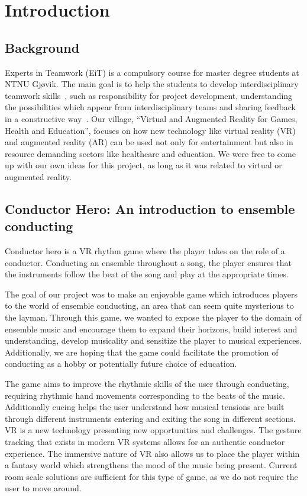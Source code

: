 \chapter{Introduction}

\section{Background}
Experts in Teamwork (EiT) is a compulsory course for master degree students at NTNU Gjøvik. The main goal is to help the students to develop interdisciplinary teamwork skills~\cite{eit}, such as responsibility for project development, understanding the possibilities which appear from interdisciplinary teams and sharing feedback in a constructive way~\cite{eitQA}. Our village, “Virtual and Augmented Reality for Games, Health and Education”, focuses on how new technology like virtual reality (VR) and augmented reality (AR) can be used not only for entertainment but also in resource demanding sectors like healthcare and education. We were free to come up with our own ideas for this project, as long as it was related to virtual or augmented reality.
\section{Conductor Hero: An introduction to ensemble conducting}
Conductor hero is a VR rhythm game where the player takes on the role of a conductor. Conducting an ensemble throughout a song, the player ensures that the instruments follow the beat of the song and play at the appropriate times. 

The goal of our project was to make an enjoyable game which introduces players to the world of ensemble conducting, an area that can seem quite mysterious to the layman. Through this game, we wanted to expose the player to the domain of ensemble music and encourage them to expand their horizons, build interest and understanding, develop musicality and sensitize the player to musical experiences. Additionally, we are hoping that the game could facilitate the promotion of conducting as a hobby or potentially future choice of education.

The game aims to improve the rhythmic skills of the user through conducting, requiring rhythmic hand movements corresponding to the beats of the music. Additionally cueing helps the user understand how musical tensions are built through different instruments entering and exiting the song in different sections.
VR is a new technology presenting new opportunities and challenges. The gesture tracking that exists in modern VR systems allows for an authentic conductor experience. The immersive nature of VR also allows us to place the player within a fantasy world which strengthens the mood of the music being present. Current room scale solutions are sufficient for this type of game, as we do not require the user to move around.


